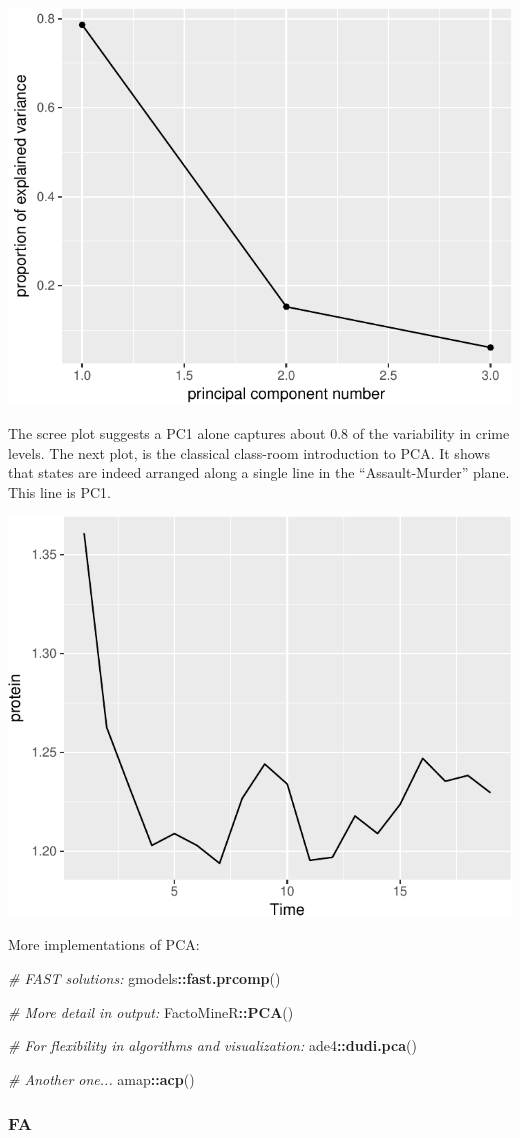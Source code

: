 \documentclass[]{book}
\newenvironment{Shaded}{\begin{snugshade}}{\end{snugshade}}
\newcommand{\CommentTok}[1]{\textcolor[rgb]{0.56,0.35,0.01}{\textit{#1}}}
\newcommand{\KeywordTok}[1]{\textcolor[rgb]{0.13,0.29,0.53}{\textbf{#1}}}
\newcommand{\NormalTok}[1]{#1}
\newcommand{\OperatorTok}[1]{\textcolor[rgb]{0.81,0.36,0.00}{\textbf{#1}}}
\theoremstyle{definition}
\theoremstyle{definition}
\theoremstyle{definition}
\theoremstyle{remark}
\begin{document}
\includegraphics[width=0.5\linewidth]{Rcourse_files/figure-latex/scree-1}

The scree plot suggests a PC1 alone captures about 0.8 of the variability in crime levels.
The next plot, is the classical class-room introduction to PCA.
It shows that states are indeed arranged along a single line in the ``Assault-Murder'' plane. This line is PC1.

\includegraphics[width=0.5\linewidth]{Rcourse_files/figure-latex/unnamed-chunk-253-1}

More implementations of PCA:

\begin{Shaded}
\begin{Highlighting}[]
\CommentTok{# FAST solutions:}
\NormalTok{gmodels}\OperatorTok{::}\KeywordTok{fast.prcomp}\NormalTok{()}

\CommentTok{# More detail in output:}
\NormalTok{FactoMineR}\OperatorTok{::}\KeywordTok{PCA}\NormalTok{()}

\CommentTok{# For flexibility in algorithms and visualization:}
\NormalTok{ade4}\OperatorTok{::}\KeywordTok{dudi.pca}\NormalTok{()}

\CommentTok{# Another one...}
\NormalTok{amap}\OperatorTok{::}\KeywordTok{acp}\NormalTok{()}
\end{Highlighting}
\end{Shaded}

\hypertarget{fa}{%
\subsubsection{FA}\label{fa}}
\end{document}
